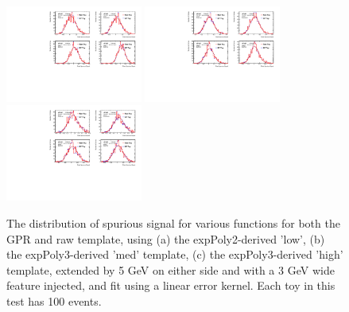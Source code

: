 \begin{figure} 
\begin{center}
  \includegraphics[width=0.4\textwidth]{figures/background/gpr/validation/linear/ToyTest_FitSigVals_lowpT_100_Sig_1s}   
  \includegraphics[width=0.4\textwidth]{figures/background/gpr/validation/linear/ToyTest_FitSigVals_medpT_100_Sig_1s}   
  \includegraphics[width=0.4\textwidth]{figures/background/gpr/validation/linear/ToyTest_FitSigVals_highpT_100_Sig_1s}   
\caption{The distribution of spurious signal for various functions for both the GPR and raw template, using (a) the expPoly2-derived 'low', (b) the expPoly3-derived 'med' template, (c) the expPoly3-derived 'high' template, extended by 5 GeV on either side and with a 3 GeV wide feature injected, and fit using a linear error kernel. Each toy in this test has 100 events.}
\label{fig:linearkernel_lowpt_100_Sig_1s}
\end{center}
\end{figure}

